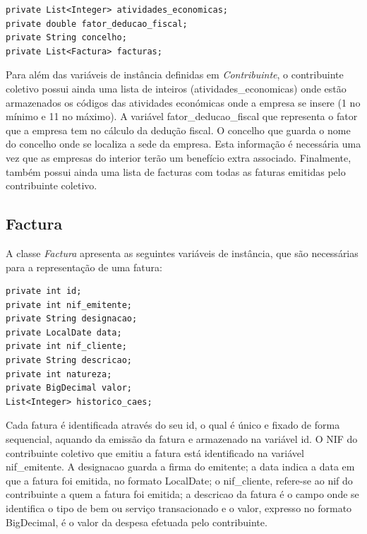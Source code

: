 \documentclass[a4paper]{article}
\begin{document}
\begin{verbatim}
private List<Integer> atividades_economicas;
private double fator_deducao_fiscal;
private String concelho;
private List<Factura> facturas;
\end{verbatim}

\vspace{0.2cm}

Para além das variáveis de instância definidas em \emph{Contribuinte},
o contribuinte coletivo possui ainda uma lista de inteiros
(\textsf{atividades\_economicas}) onde estão armazenados
os códigos das atividades económicas onde a empresa se insere (1 no mínimo e
11 no máximo). A variável \textsf{fator\_deducao\_fiscal} que representa o fator
que a empresa tem no cálculo da dedução fiscal. O \textsf{concelho} que guarda o nome do concelho
onde se localiza a sede da empresa. Esta informação é necessária uma vez que as
empresas do interior terão um benefício extra associado.
Finalmente, também possui ainda uma lista de \textsf{facturas} com todas as faturas
emitidas pelo contribuinte coletivo.



\subsection{Factura}
\label{sec:fatura}

A classe \emph{Factura} apresenta as seguintes variáveis de instância, que são
necessárias para a representação de uma fatura:

\begin{verbatim}
private int id;
private int nif_emitente;
private String designacao;
private LocalDate data;
private int nif_cliente;
private String descricao;
private int natureza;
private BigDecimal valor;
List<Integer> historico_caes;
\end{verbatim}

\vspace{0.2cm}

Cada fatura é identificada através do seu \textrm{id},
o qual é único e fixado de forma sequencial, aquando da emissão da fatura e
armazenado na variável \textsf{id}.
O \textrm{NIF do contribuinte coletivo} que emitiu a fatura está identificado na
variável \textsf{nif\_emitente}. A \textsf{designacao} guarda a firma do emitente; a \textsf{data}
indica a data em que a fatura foi emitida, no formato \textrm{LocalDate}; o
\textsf{nif\_cliente}, refere-se ao nif do contribuinte a quem a fatura foi emitida;
 a \textsf{descricao} da fatura é o campo onde se identifica o tipo de bem ou serviço
transacionado e o \textsf{valor}, expresso no formato \textrm{BigDecimal}, é o
valor da despesa efetuada pelo contribuinte.
\end{document}

